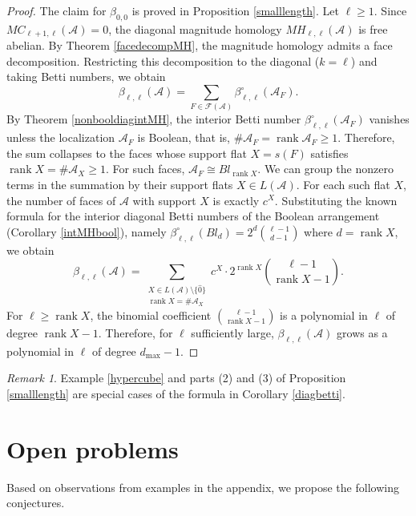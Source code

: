 \documentclass{amsart}
\numberwithin{equation}{section}
\theoremstyle{plain}
\theoremstyle{remark}
\newtheorem{rem}[thm]{Remark}
\theoremstyle{definition}
\numberwithin{equation}{section}
\newcommand{\A}{\mathcal{A}}
\newcommand{\FF}{\mathcal{F}}
\DeclareMathOperator{\rank}{rank}
\begin{document}
\begin{proof}
    The claim for $\beta_{0,0}$ is proved in Proposition \ref{smalllength}.
    Let $\ell\geq 1$.
    Since $MC_{\ell+1,\ell}(\A)=0$, the diagonal magnitude homology $MH_{\ell,\ell}(\A)$ is free abelian. By Theorem \ref{facedecompMH}, the magnitude homology admits a face decomposition. Restricting this decomposition to the diagonal ($k=\ell$) and taking Betti numbers, we obtain
    \[
    \beta_{\ell,\ell}(\A) = \sum_{F \in \FF(\A)} \beta^\circ_{\ell,\ell}(\A_F).
    \]
    By Theorem \ref{nonbooldiagintMH}, the interior Betti number $\beta^\circ_{\ell,\ell}(\A_F)$ vanishes unless the localization $\A_F$ is Boolean, that is, $\#\A_F=\rank \A_F\geq 1$.
    Therefore, the sum collapses to the faces whose support flat $X = s(F)$ satisfies $\rank X = \#\A_X\geq 1$.
    For such faces, $\A_F \cong Bl_{\rank X}$.
    We can group the nonzero terms in the summation by their support flats $X \in L(\A)$.
    For each such flat $X$, the number of faces of $\A$ with support $X$ is exactly $c^X$.
    Substituting the known formula for the interior diagonal Betti numbers of the Boolean arrangement (Corollary \ref{intMHbool}), namely $\beta^\circ_{\ell,\ell}(Bl_d) = 2^d \binom{\ell-1}{d-1}$ where $d = \rank X$, we obtain
    \[
    \beta_{\ell,\ell}(\A) = \sum_{\substack{X \in L(\A)\setminus\{\hat{0}\} \\ \rank X = \#\A_X}} c^X \cdot 2^{\rank X} \binom{\ell-1}{\operatorname{rank}X - 1}.
    \]
    For $\ell\geq\rank X$, the binomial coefficient $\binom{\ell-1}{\rank X-1}$ is a polynomial in $\ell$ of degree $\rank X-1$. Therefore, for $\ell$ sufficiently large, $\beta_{\ell,\ell}(\A)$ grows as a polynomial in $\ell$ of degree $d_{\max}-1$.
\end{proof}

\begin{rem}
    Example \ref{hypercube} and parts (2) and (3) of Proposition \ref{smalllength} are special cases of the formula in Corollary \ref{diagbetti}.
\end{rem}






\section{Open problems}
Based on observations from examples in the appendix, we propose the following conjectures.
\end{document}
